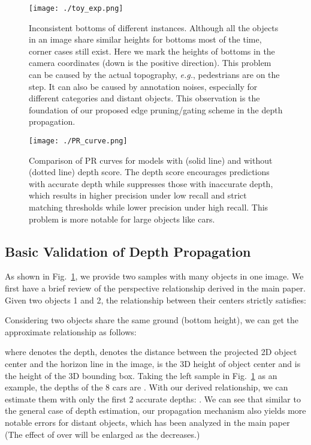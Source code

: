 \begin{figure}
\begin{center}
\texttt{[image: ./toy\_exp.png]}
\end{center}
   \vspace{-3ex}
   \caption{Inconsistent bottoms of different instances. Although all the objects in an image share similar heights for bottoms most of the time, corner cases still exist. Here we mark the heights of bottoms in the camera coordinates (down is the positive direction). This problem can be caused by the actual topography, \emph{e.g.}, pedestrians are on the step. It can also be caused by annotation noises, especially for different categories and distant objects. This observation is the foundation of our proposed edge pruning/gating scheme in the depth propagation.}
\label{fig: toy_exp}
\vspace{-1.5ex}
\end{figure}
\begin{figure}
\begin{center}
\texttt{[image: ./PR\_curve.png]}
\end{center}
   \vspace{-4ex}
   \caption{Comparison of PR curves for models with (solid line) and without (dotted line) depth score. The depth score encourages predictions with accurate depth while suppresses those with inaccurate depth, which results in higher precision under low recall and strict matching thresholds while lower precision under high recall. This problem is more notable for large objects like cars.}
   \vspace{-2.5ex}
\label{fig: PR_curve}
\end{figure}

\subsection{Basic Validation of Depth Propagation}
As shown in Fig.~\ref{fig: toy_exp}, we provide two samples with many objects in one image. We first have a brief review of the perspective relationship derived in the main paper. Given two objects 1 and 2, the relationship between their centers strictly satisfies:

Considering two objects share the same ground (bottom height), we can get the approximate relationship as follows:

where  denotes the depth,  denotes the distance between the projected 2D object center and the horizon line in the image,  is the 3D height of object center and  is the height of the 3D bounding box. Taking the left sample in Fig.~\ref{fig: toy_exp} as an example, the depths of the 8 cars are . With our derived relationship, we can estimate them with only the first 2 accurate depths: . We can see that similar to the general case of depth estimation, our propagation mechanism also yields more notable errors for distant objects, which has been analyzed in the main paper (The effect of  over  will be enlarged as the  decreases.)

